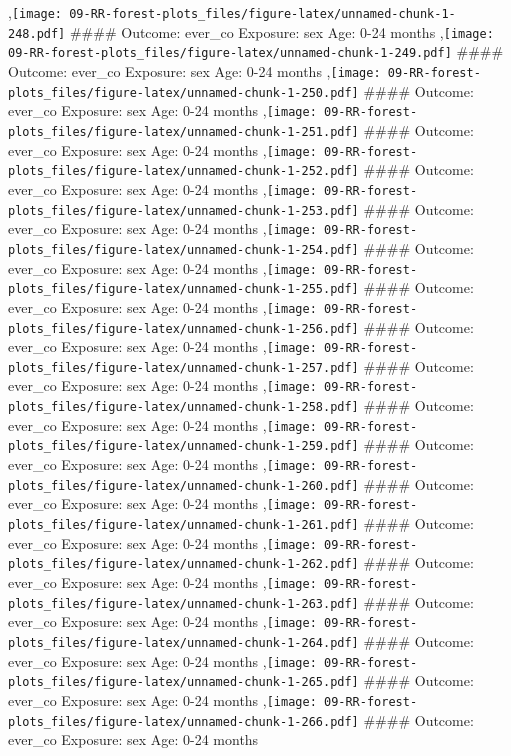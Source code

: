 \documentclass[
  9pt,
]{book}
\begin{document}
,\texttt{[image: 09-RR-forest-plots\_files/figure-latex/unnamed-chunk-1-248.pdf]}
\#\#\#\# Outcome: ever\_co Exposure: sex Age: 0-24 months
,\texttt{[image: 09-RR-forest-plots\_files/figure-latex/unnamed-chunk-1-249.pdf]}
\#\#\#\# Outcome: ever\_co Exposure: sex Age: 0-24 months
,\texttt{[image: 09-RR-forest-plots\_files/figure-latex/unnamed-chunk-1-250.pdf]}
\#\#\#\# Outcome: ever\_co Exposure: sex Age: 0-24 months
,\texttt{[image: 09-RR-forest-plots\_files/figure-latex/unnamed-chunk-1-251.pdf]}
\#\#\#\# Outcome: ever\_co Exposure: sex Age: 0-24 months
,\texttt{[image: 09-RR-forest-plots\_files/figure-latex/unnamed-chunk-1-252.pdf]}
\#\#\#\# Outcome: ever\_co Exposure: sex Age: 0-24 months
,\texttt{[image: 09-RR-forest-plots\_files/figure-latex/unnamed-chunk-1-253.pdf]}
\#\#\#\# Outcome: ever\_co Exposure: sex Age: 0-24 months
,\texttt{[image: 09-RR-forest-plots\_files/figure-latex/unnamed-chunk-1-254.pdf]}
\#\#\#\# Outcome: ever\_co Exposure: sex Age: 0-24 months
,\texttt{[image: 09-RR-forest-plots\_files/figure-latex/unnamed-chunk-1-255.pdf]}
\#\#\#\# Outcome: ever\_co Exposure: sex Age: 0-24 months
,\texttt{[image: 09-RR-forest-plots\_files/figure-latex/unnamed-chunk-1-256.pdf]}
\#\#\#\# Outcome: ever\_co Exposure: sex Age: 0-24 months
,\texttt{[image: 09-RR-forest-plots\_files/figure-latex/unnamed-chunk-1-257.pdf]}
\#\#\#\# Outcome: ever\_co Exposure: sex Age: 0-24 months
,\texttt{[image: 09-RR-forest-plots\_files/figure-latex/unnamed-chunk-1-258.pdf]}
\#\#\#\# Outcome: ever\_co Exposure: sex Age: 0-24 months
,\texttt{[image: 09-RR-forest-plots\_files/figure-latex/unnamed-chunk-1-259.pdf]}
\#\#\#\# Outcome: ever\_co Exposure: sex Age: 0-24 months
,\texttt{[image: 09-RR-forest-plots\_files/figure-latex/unnamed-chunk-1-260.pdf]}
\#\#\#\# Outcome: ever\_co Exposure: sex Age: 0-24 months
,\texttt{[image: 09-RR-forest-plots\_files/figure-latex/unnamed-chunk-1-261.pdf]}
\#\#\#\# Outcome: ever\_co Exposure: sex Age: 0-24 months
,\texttt{[image: 09-RR-forest-plots\_files/figure-latex/unnamed-chunk-1-262.pdf]}
\#\#\#\# Outcome: ever\_co Exposure: sex Age: 0-24 months
,\texttt{[image: 09-RR-forest-plots\_files/figure-latex/unnamed-chunk-1-263.pdf]}
\#\#\#\# Outcome: ever\_co Exposure: sex Age: 0-24 months
,\texttt{[image: 09-RR-forest-plots\_files/figure-latex/unnamed-chunk-1-264.pdf]}
\#\#\#\# Outcome: ever\_co Exposure: sex Age: 0-24 months
,\texttt{[image: 09-RR-forest-plots\_files/figure-latex/unnamed-chunk-1-265.pdf]}
\#\#\#\# Outcome: ever\_co Exposure: sex Age: 0-24 months
,\texttt{[image: 09-RR-forest-plots\_files/figure-latex/unnamed-chunk-1-266.pdf]}
\#\#\#\# Outcome: ever\_co Exposure: sex Age: 0-24 months
\end{document}
